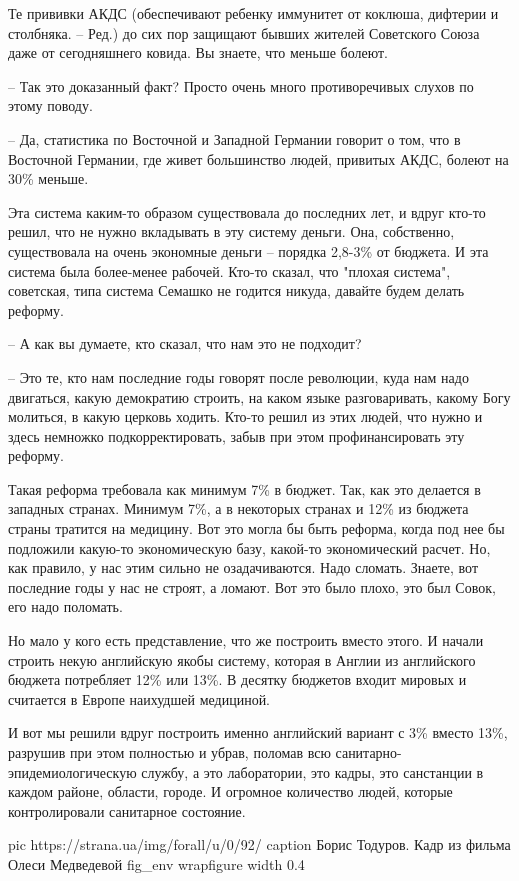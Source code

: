 Те прививки АКДС (обеспечивают ребенку иммунитет от коклюша, дифтерии и столбняка. – Ред.) до сих пор защищают бывших жителей Советского Союза даже от сегодняшнего ковида. Вы знаете, что меньше болеют. 

– Так это доказанный факт? Просто очень много противоречивых слухов по этому поводу. 

– Да, статистика по Восточной и Западной Германии говорит о том, что в
Восточной Германии, где живет большинство людей, привитых АКДС, болеют на 30\%
меньше. 

Эта система каким-то образом существовала до последних лет, и вдруг кто-то
решил, что не нужно вкладывать в эту систему деньги. Она, собственно,
существовала на очень экономные деньги – порядка 2,8-3\% от бюджета. И эта
система была более-менее рабочей. Кто-то сказал, что "плохая система",
советская, типа система Семашко не годится никуда, давайте будем делать
реформу.

– А как вы думаете, кто сказал, что нам это не подходит?

– Это те, кто нам последние годы говорят после революции, куда нам надо
двигаться, какую демократию строить, на каком языке разговаривать, какому Богу
молиться, в какую церковь ходить. Кто-то решил из этих людей, что нужно и здесь
немножко подкорректировать, забыв при этом профинансировать эту реформу. 

Такая реформа требовала как минимум 7\% в бюджет. Так, как это делается в
западных странах. Минимум 7\%, а в некоторых странах и 12\% из бюджета страны
тратится на медицину. Вот это могла бы быть реформа, когда под нее бы подложили
какую-то экономическую базу, какой-то экономический расчет. Но, как правило, у
нас этим сильно не озадачиваются. Надо сломать. Знаете, вот последние годы у
нас не строят, а ломают. Вот это было плохо, это был Совок, его надо поломать.

Но мало у кого есть представление, что же построить вместо этого. И начали
строить некую английскую якобы систему, которая в Англии из английского бюджета
потребляет 12\% или 13\%. В десятку бюджетов входит мировых и считается в
Европе наихудшей медициной.

И вот мы решили вдруг построить именно английский вариант с 3\% вместо 13\%,
разрушив при этом полностью и убрав, поломав всю санитарно-эпидемиологическую
службу, а это лаборатории, это кадры, это санстанции в каждом районе, области,
городе. И огромное количество людей, которые контролировали санитарное
состояние.

\ifcmt
pic https://strana.ua/img/forall/u/0/92/%
caption Борис Тодуров. Кадр из фильма Олеси Медведевой 
fig_env wrapfigure
width 0.4
\fi

